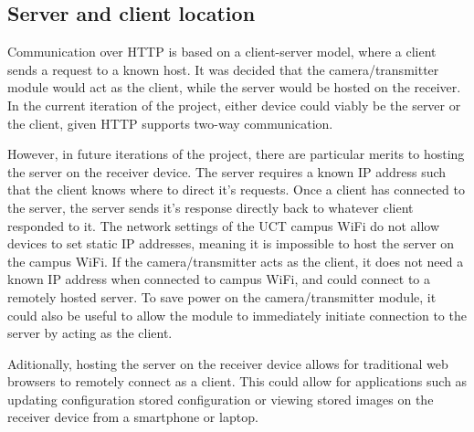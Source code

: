 \documentclass[class=report,11pt,crop=false]{standalone}
\begin{document}
\subsection{Server and client location}

Communication over HTTP is based on a client-server model, where a client sends a request to a known host. It was decided that the camera/transmitter module would act as the client, while the server would be hosted on the receiver. In the current iteration of the project, either device could viably be the server or the client, given HTTP supports two-way communication. 

However, in future iterations of the project, there are particular merits to hosting the server on the receiver device. The server requires a known IP address such that the client knows where to direct it's requests. Once a client has connected to the server, the server sends it's response directly back to whatever client responded to it. The network settings of the UCT campus WiFi do not allow devices to set static IP addresses, meaning it is impossible to host the server on the campus WiFi. If the camera/transmitter acts as the client, it does not need a known IP address when connected to campus WiFi, and could connect to a remotely hosted server. To save power on the camera/transmitter module, it could also be useful to allow the module to immediately initiate connection to the server by acting as the client. 

Aditionally, hosting the server on the receiver device allows for traditional web browsers to remotely connect as a client. This could allow for applications such as updating configuration stored configuration or viewing stored images on the receiver device from a smartphone or laptop.


\end{document}
